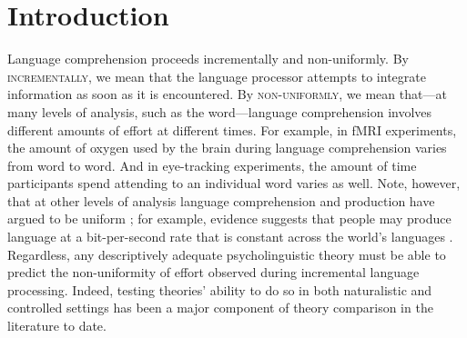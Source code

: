 \documentclass[12pt]{article}
\newcommand{\defn}[1]{\textsc{#1}}
\begin{document}
\section{Introduction}

Language comprehension proceeds incrementally and non-uniformly. By \defn{incrementally}, we mean that the language processor attempts to integrate information as soon as it is encountered.
By \defn{non-uniformly}, we mean that---at many levels of analysis, such as the word---language comprehension involves different amounts of effort at different times. For example, in fMRI experiments, the amount of oxygen used by the brain during language comprehension varies from word to word. And in eye-tracking experiments, the amount of time participants spend attending to an individual word varies as well. Note, however, that at other levels of analysis language comprehension and production have argued to be uniform \citep{fenk1980konstanz, jaeger2006speakers, meister-etal-2021-revisiting}; for example, evidence suggests that people may produce language at a bit-per-second rate that is constant across the world's languages \citep{pellegrino2011cross, coupe2019different}. Regardless, any descriptively adequate psycholinguistic theory must be able to predict the non-uniformity of effort observed during incremental language processing. Indeed, testing theories' ability to do so in both naturalistic and controlled settings has been a major component of theory comparison in the literature to date.
\end{document}
